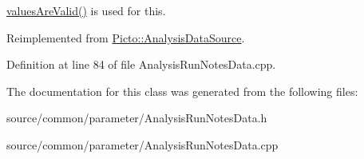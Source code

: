 \hyperlink{class_picto_1_1_parameter_a3443808da4c3edf26f2c3c3772d95b10}{values\-Are\-Valid()} is used for this. 

Reimplemented from \hyperlink{class_picto_1_1_analysis_data_source_a8d43777d1a7d1b1467c9df205d118bb3}{Picto\-::\-Analysis\-Data\-Source}.



Definition at line 84 of file Analysis\-Run\-Notes\-Data.\-cpp.



The documentation for this class was generated from the following files\-:\begin{DoxyCompactItemize}
\item 
source/common/parameter/Analysis\-Run\-Notes\-Data.\-h\item 
source/common/parameter/Analysis\-Run\-Notes\-Data.\-cpp\end{DoxyCompactItemize}
